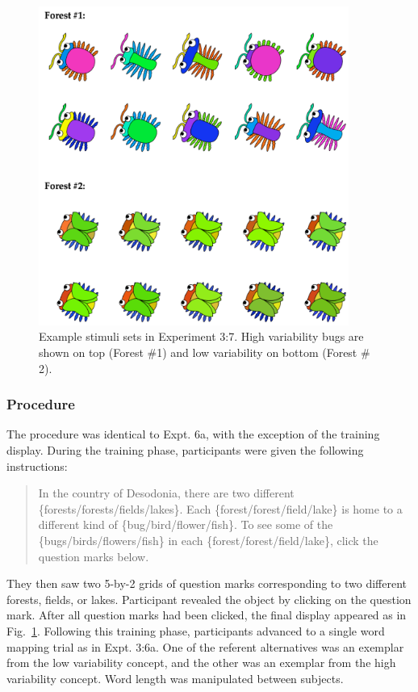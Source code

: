   \begin{figure}[t!]
 \begin{center}
  \includegraphics[width=4in]{figs/var_screen_shot.png}
  \caption{\label{fig:var_screen_shot} Example stimuli sets in Experiment 3:7. High variability bugs are shown on top (Forest \#1) and low variability on bottom (Forest \# 2).}
 \end{center}
\end{figure}

\subsubsection{Procedure}
The procedure was identical to Expt. 6a, with the exception of the training display. During the training phase, participants were given the following instructions:

\begin{quote}
In the country of Desodonia, there are two different \{forests/forests/fields/lakes\}. Each \{forest/forest/field/lake\}  is home to a different kind of \{bug/bird/flower/fish\}. To see some of the \{bugs/birds/flowers/fish\} in each \{forest/forest/field/lake\}, click the question marks below.
\end{quote}

They then saw two 5-by-2 grids of question marks corresponding to two different forests, fields, or lakes. Participant revealed the object by clicking on the question mark. After all question marks had been clicked, the final display appeared as in Fig.\ \ref{fig:var_screen_shot}. Following this training phase, participants advanced to a single word mapping trial as in Expt. 3:6a. One of the referent alternatives was an exemplar from the low variability concept, and the other was an exemplar from the high variability concept. Word length was manipulated between subjects.

